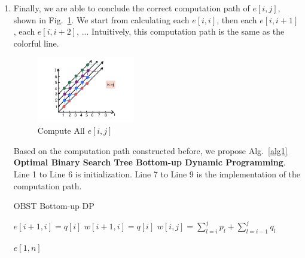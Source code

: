 \documentclass[12pt,a4paper]{article}
\makeatletter
\newtheorem*{solution}{Solution}
\theoremstyle{definition}
\renewenvironment{solution}[1][Solution] {\par\pushQED{\qed}\normalfont\topsep6\p@\@plus6\p@\relax\trivlist\item[\hskip\labelsep\bfseries#1\@addpunct{.}]\ignorespaces}{\popQED\endtrivlist\@endpefalse} \makeatother
\makeatother
\begin{document}
\begin{enumerate}
\begin{enumerate}
\begin{solution}
            Finally, we are able to conclude the correct computation path of $e[i,j]$, shown in Fig.~\ref{axis3}. We start from calculating each $e[i,i]$, then each $e[i,i+1]$, each $e[i,i+2]$, ... Intuitively, this computation path is the same as {\color{orange}the colorful line}.
            
            
            \begin{figure}[htbp]
                \centering
                \includegraphics[width=0.4\textwidth]{Lab05-YanjieZe/axis3.jpg}
                \caption{Compute All $e[i,j]$}\label{axis3}
            \end{figure}
			
            Based on the computation path constructed before, we propose Alg.~\ref{alg1} \textbf{Optimal Binary Search Tree Bottom-up Dynamic Programming}. Line 1 to Line 6 is initialization. Line 7 to Line 9 is the implementation of the computation path.
            
            
            
            \begin{algorithm}[H]
               \caption{OBST Bottom-up DP}\label{alg1}
               {
                    $e[i+1,i]=q[i]$\;
                    $w[i+1,i]=q[i]$\;
               }
               {
                    {
                        $w[i,j]=\sum_{l=i}^{j} p_{l}+\sum_{l=i-1}^{j} q_{l}$
                    }
               }
               
               \Return $e[1,n]$
            			

\end{algorithm}
\end{solution}
\end{enumerate}
\end{enumerate}
\end{document}
